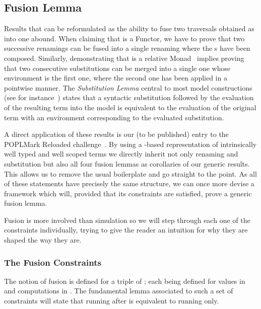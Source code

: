 \subsection{Fusion Lemma}\label{section:fusion}

Results that can be reformulated as the ability to fuse two traversals
obtained as \semrec{} into one abound. When claiming that  is
a Functor, we have to prove that two successive renamings can be fused into
a single renaming where the s have been composed. Similarly,
demonstrating that  is a relative Monad~\cite{JFR4389} implies proving
that two consecutive substitutions can be merged into a single one whose
environment is the first one, where the second one has been applied in a
pointwise manner. The \emph{Substitution Lemma} central
to most model constructions (see for instance~\cite{mitchell1991kripke}) states
that a syntactic substitution followed by the evaluation of the resulting term
into the model is equivalent to the evaluation of the original term with an
environment corresponding to the evaluated substitution.

A direct application of these results is our (to be published) entry to the
POPLMark Reloaded challenge~\citeyear{poplmarkreloaded}. By using a -based
representation of intrinsically well typed and well scoped terms we directly inherit
not only renaming and substitution but also all four fusion lemmas as corollaries
of our generic results. This allows us to remove the usual boilerplate
and go straight to the point.
As all of these statements have precisely the same structure, we can
once more devise a framework which will, provided that its constraints are
satisfied, prove a generic fusion lemma.

Fusion is more involved than simulation so we will step through
each one of the constraints individually, trying to give the reader an intuition
for why they are shaped the way they are.

\subsubsection{The Fusion Constraints}

The notion of fusion is defined for a triple of ; each 
being defined for values in  and computations in . The
fundamental lemma associated to such a set of constraints will state that
running  after  is equivalent to running  only.

